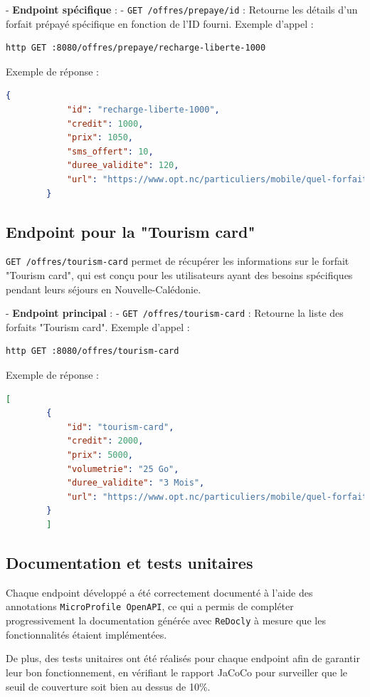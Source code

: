 \documentclass{article}
\begin{document}
	- \textbf{Endpoint spécifique} :
	- \texttt{GET /offres/prepaye/{id}} : Retourne les détails d'un forfait prépayé spécifique en fonction de l'ID fourni.
	Exemple d'appel :
	\begin{lstlisting}[language=bash]
		http GET :8080/offres/prepaye/recharge-liberte-1000
	\end{lstlisting}
	Exemple de réponse :
	\begin{lstlisting}[language=JSON]
		{
			"id": "recharge-liberte-1000",
			"credit": 1000,
			"prix": 1050,
			"sms_offert": 10,
			"duree_validite": 120,
			"url": "https://www.opt.nc/particuliers/mobile/quel-forfait-choisir/kit-prepaye-liberte"
		}
	\end{lstlisting}
	
	\subsection{Endpoint pour la "Tourism card"}
	\texttt{GET /offres/tourism-card} permet de récupérer les informations sur le forfait "Tourism card", qui est conçu pour les utilisateurs ayant des besoins spécifiques pendant leurs séjours en Nouvelle-Calédonie.
	
	- \textbf{Endpoint principal} :
	- \texttt{GET /offres/tourism-card} : Retourne la liste des forfaits "Tourism card".
	Exemple d'appel :
	\begin{lstlisting}[language=bash]
		http GET :8080/offres/tourism-card
	\end{lstlisting}
	Exemple de réponse :
	\begin{lstlisting}[language=JSON]
		[
		{
			"id": "tourism-card",
			"credit": 2000,
			"prix": 5000,
			"volumetrie": "25 Go",
			"duree_validite": "3 Mois",
			"url": "https://www.opt.nc/particuliers/mobile/quel-forfait-choisir/tourism-card-1000"
		}
		]
	\end{lstlisting}
	
	\subsection{Documentation et tests unitaires}
	
	Chaque endpoint développé a été correctement documenté à l'aide des annotations \texttt{MicroProfile OpenAPI}, ce qui a permis de compléter progressivement la documentation générée avec \texttt{ReDocly} à mesure que les fonctionnalités étaient implémentées.
	
	De plus, des tests unitaires ont été réalisés pour chaque endpoint afin de garantir leur bon fonctionnement, en vérifiant le rapport JaCoCo pour surveiller que le seuil de couverture soit bien au dessus de 10\%.
\end{document}
